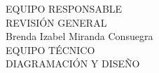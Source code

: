 {\Bold \LARGE EQUIPO RESPONSABLE}\\[2cm]
{\Bold \large \color{color1!89!black} REVISIÓN GENERAL}\\[0.2cm]
Brenda Izabel Miranda Consuegra\\[0.8cm]
{\Bold \large \color{color1!89!black} EQUIPO TÉCNICO}\\[0.2cm]
{\Bold \large \color{color1!89!black} DIAGRAMACIÓN Y DISEÑO}\\[0.2cm]
